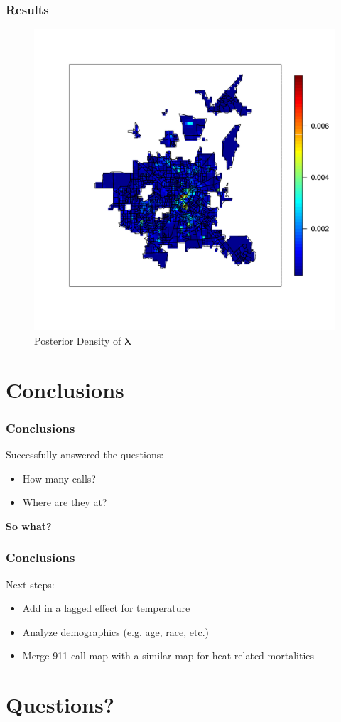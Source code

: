 \documentclass[10pt, compress]{beamer}
\begin{document}
  \begin{frame}
    \frametitle{Results}
   \centering
    \begin{figure}
      \caption{Posterior Density of $\boldsymbol\lambda$}
      \includegraphics[height=0.7\textheight]{posteriorLocationDensity.pdf}
    \end{figure}
  \end{frame}
  \section{Conclusions}
  \begin{frame}
    \frametitle{Conclusions}
    Successfully answered the questions:
    \begin{itemize}
      \item How many calls?
      \item Where are they at?
    \end{itemize}
    \pause
    \textbf{So what?}
  \end{frame}
  \begin{frame}
    \frametitle{Conclusions}
    Next steps:
    \begin{itemize}
      \item Add in a lagged effect for temperature
      \item Analyze demographics (e.g. age, race, etc.)
      \item Merge 911 call map with a similar map for heat-related mortalities
    \end{itemize}
  \end{frame}
  \section{Questions?}
\end{document}
